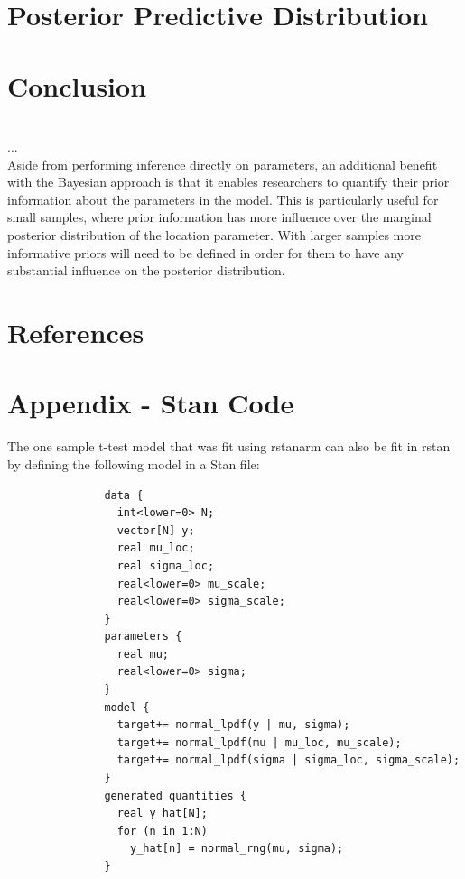 \documentclass[12pt]{article}
\begin{document}
\section{Posterior Predictive Distribution}

\section{Conclusion}

 \\

\noindent ... \\

\noindent Aside from performing inference directly on parameters, an additional benefit with the Bayesian approach is that it enables researchers to quantify their prior information about the parameters in the model. This is particularly useful for small samples, where prior information has more influence over the marginal posterior distribution of the location parameter. With larger samples more informative priors will need to be defined in order for them to have any substantial influence on the posterior distribution.

\pagebreak

\section{References}


\pagebreak

\section{Appendix - Stan Code}

\noindent The one sample t-test model that was fit using rstanarm can also be fit in rstan by defining the following model in a Stan file:

\begin{verbatim}
               data {
                 int<lower=0> N;
                 vector[N] y;
                 real mu_loc;
                 real sigma_loc;
                 real<lower=0> mu_scale;
                 real<lower=0> sigma_scale;
               }
               parameters {
                 real mu;
                 real<lower=0> sigma;
               }
               model {
                 target+= normal_lpdf(y | mu, sigma);
                 target+= normal_lpdf(mu | mu_loc, mu_scale);
                 target+= normal_lpdf(sigma | sigma_loc, sigma_scale);
               }
               generated quantities {
                 real y_hat[N];
                 for (n in 1:N)
                   y_hat[n] = normal_rng(mu, sigma);
               }

\end{verbatim}
\end{document}

